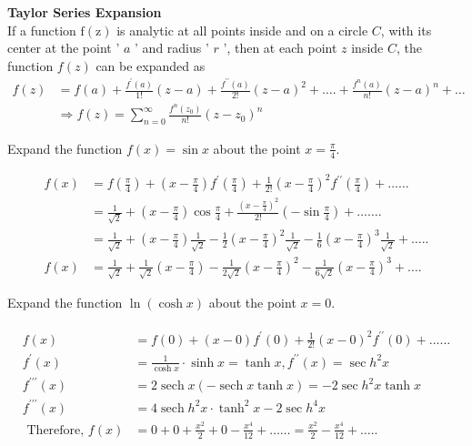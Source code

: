 \textbf{Taylor Series Expansion}\\
If a function $\mathrm{f}(\mathrm{z})$ is analytic at all points inside and on a circle $C$, with its center at the point ' $a$ ' and radius ' $r$ ', then at each point $z$ inside $C$, the function $f(z)$ can be expanded as
\begin{align*}
	f(z) &=f(a)+\frac{f^{\prime}(a)}{1 !}(z-a)+\frac{f^{\prime \prime}(a)}{2 !}(z-a)^{2}+\ldots .+\frac{f^{n}(a)}{n !}(z-a)^{n}+\ldots \\
	& \Rightarrow f(z)=\sum_{n=0}^{\infty} \frac{f^{n}\left(z_{0}\right)}{n !}\left(z-z_{0}\right)^{n}
\end{align*}
\begin{exercise}
	Expand the function $f(x)=\sin x$ about the point $x=\frac{\pi}{4}$.
\end{exercise}
\begin{answer}
	\begin{align*}
	f(x) &=f\left(\frac{\pi}{4}\right)+\left(x-\frac{\pi}{4}\right) f^{\prime}\left(\frac{\pi}{4}\right)+\frac{1}{2 !}\left(x-\frac{\pi}{4}\right)^{2} f^{\prime \prime}\left(\frac{\pi}{4}\right)+\ldots \ldots \\
	&=\frac{1}{\sqrt{2}}+\left(x-\frac{\pi}{4}\right) \cos \frac{\pi}{4}+\frac{\left(x-\frac{\pi}{4}\right)^{2}}{2 !}\left(-\sin \frac{\pi}{4}\right)+\ldots \ldots .\\
	\quad&=\frac{1}{\sqrt{2}}+\left(x-\frac{\pi}{4}\right) \frac{1}{\sqrt{2}}-\frac{1}{2}\left(x-\frac{\pi}{4}\right)^{2} \frac{1}{\sqrt{2}}-\frac{1}{6}\left(x-\frac{\pi}{4}\right)^{3} \frac{1}{\sqrt{2}}+\ldots . . \\
	f(x)&=\frac{1}{\sqrt{2}}+\frac{1}{\sqrt{2}}\left(x-\frac{\pi}{4}\right)-\frac{1}{2 \sqrt{2}}\left(x-\frac{\pi}{4}\right)^{2}-\frac{1}{6 \sqrt{2}}\left(x-\frac{\pi}{4}\right)^{3}+\ldots .
	\end{align*}
\end{answer}
\begin{exercise}
	Expand the function $\ln (\cosh x)$ about the point $x=0$.
\end{exercise}
\begin{answer}
	\begin{align*}
	\begin{aligned}
	f(x)&=f(0)+(x-0) f^{\prime}(0)+\frac{1}{2 !}(x-0)^{2} f^{\prime \prime}(0)+\ldots \ldots \\
	f^{\prime}(x)&=\frac{1}{\cosh x} \cdot \sinh x=\tanh x, f^{\prime \prime}(x)=\sec h^{2} x \\
	f^{\prime \prime \prime}(x)&=2 \operatorname{sech} x(-\operatorname{sech} x \tanh x)=-2 \sec h^{2} x \tanh x \\
	f^{\prime \prime \prime}(x)&=4 \operatorname{sech} h^{2} x \cdot \tanh ^{2} x-2 \sec h^{4} x\\
	\text { Therefore, } f(x)&=0+0+\frac{x^{2}}{2}+0-\frac{x^{4}}{12}+\ldots \ldots=\frac{x^{2}}{2}-\frac{x^{4}}{12}+\ldots . .
	\end{aligned}
	\end{align*}
\end{answer}




